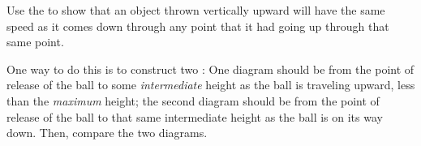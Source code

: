 \label{fnt2.2.1-3}

Use the \EnergyInteractionModel{} to show that an object thrown vertically upward will have the same speed as it comes down through any point that it had going up through that same point.

One way to do this is to construct two \EnergyDiagrams{}: One diagram should be from the point of release of the ball to some {\em intermediate} height as the ball is traveling upward, less than the {\em maximum} height; the second diagram should be from the point of release of the ball to that same intermediate height as the ball is on its way down. Then, compare the two diagrams. 